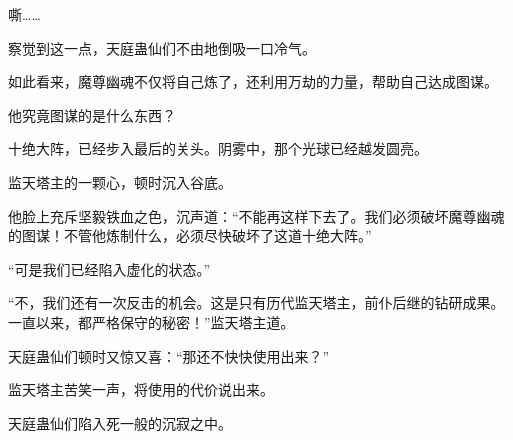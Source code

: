 \begin{this_body}
嘶……

察觉到这一点，天庭蛊仙们不由地倒吸一口冷气。

如此看来，魔尊幽魂不仅将自己炼了，还利用万劫的力量，帮助自己达成图谋。

他究竟图谋的是什么东西？

十绝大阵，已经步入最后的关头。阴雾中，那个光球已经越发圆亮。

监天塔主的一颗心，顿时沉入谷底。

他脸上充斥坚毅铁血之色，沉声道：“不能再这样下去了。我们必须破坏魔尊幽魂的图谋！不管他炼制什么，必须尽快破坏了这道十绝大阵。”

“可是我们已经陷入虚化的状态。”

“不，我们还有一次反击的机会。这是只有历代监天塔主，前仆后继的钻研成果。一直以来，都严格保守的秘密！”监天塔主道。

天庭蛊仙们顿时又惊又喜：“那还不快快使用出来？”

监天塔主苦笑一声，将使用的代价说出来。

天庭蛊仙们陷入死一般的沉寂之中。

\end{this_body}

